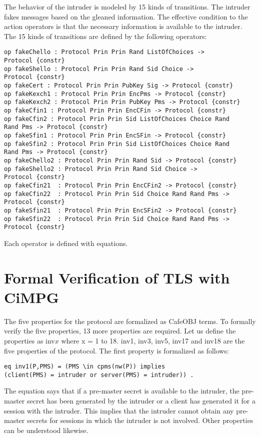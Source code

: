 \documentclass[a4paper,fleqn]{cas-dc}
\begin{document}
The behavior of the intruder is modeled by 15
kinds of transitions. The intruder fakes messages based on the gleaned information. The effective condition to the action operators is that the necessary information is available to the intruder. The 15 kinds of transitions are defined by the following operators:
\begin{small}
\begin{verbatim}
op fakeChello : Protocol Prin Prin Rand ListOfChoices ->
Protocol {constr}
op fakeShello : Protocol Prin Prin Rand Sid Choice ->
Protocol {constr}
op fakeCert : Protocol Prin Prin PubKey Sig -> Protocol {constr}
op fakeKexch1 : Protocol Prin Prin EncPms -> Protocol {constr}
op fakeKexch2 : Protocol Prin Prin PubKey Pms -> Protocol {constr}
op fakeCfin1 : Protocol Prin Prin EncCFin -> Protocol {constr}
op fakeCfin2 : Protocol Prin Prin Sid ListOfChoices Choice Rand 
Rand Pms -> Protocol {constr}
op fakeSfin1 : Protocol Prin Prin EncSFin -> Protocol {constr}
op fakeSfin2 : Protocol Prin Prin Sid ListOfChoices Choice Rand 
Rand Pms -> Protocol {constr}
op fakeChello2 : Protocol Prin Prin Rand Sid -> Protocol {constr}
op fakeShello2 : Protocol Prin Prin Rand Sid Choice ->
Protocol {constr}
op fakeCfin21  : Protocol Prin Prin EncCFin2 -> Protocol {constr}
op fakeCfin22  : Protocol Prin Prin Sid Choice Rand Rand Pms -> 
Protocol {constr}
op fakeSfin21  : Protocol Prin Prin EncSFin2 -> Protocol {constr}
op fakeSfin22  : Protocol Prin Prin Sid Choice Rand Rand Pms -> 
Protocol {constr} 
\end{verbatim}
\end{small}	
Each operator is defined with equations.

\section{Formal Verification of TLS with CiMPG}\label{fvtls}
The five properties for the protocol \cite{1437139} are formalized as CafeOBJ terms. To formally verify the five properties, 13 more properties are required. Let us define the properties as inv$x$ where x = 1 to 18. inv1, inv3, inv5, inv17 and inv18 are the five properties of the protocol. The first property is formalized as follows: 
\begin{small}
\begin{verbatim}
eq inv1(P,PMS) = (PMS \in cpms(nw(P)) implies 
(client(PMS) = intruder or server(PMS) = intruder)) .
\end{verbatim}
\end{small}
The equation says that if a pre-master secret is available to the intruder, the pre-master secret has been generated by the intruder or a client has generated it for a session with the intruder. This implies that the intruder cannot obtain any pre-master secrets for sessions in which the intruder is not involved. Other properties can be understood likewise.
\end{document}
